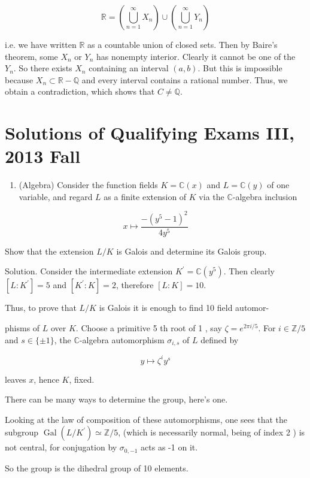\documentclass[10pt]{article}
\begin{document}
$$
\mathbb{R}=\left(\bigcup_{n=1}^{\infty} X_{n}\right) \cup\left(\bigcup_{n=1}^{\infty} Y_{n}\right)
$$

i.e. we have written $\mathbb{R}$ as a countable union of closed sets. Then by Baire's theorem, some $X_{n}$ or $Y_{n}$ has nonempty interior. Clearly it cannot be one of the $Y_{n}$. So there exists $X_{n}$ containing an interval $(a, b)$. But this is impossible because $X_{n} \subset \mathbb{R}-\mathbb{Q}$ and every interval contains a rational number. Thus, we obtain a contradiction, which shows that $C \neq \mathbb{Q}$.

\section{Solutions of Qualifying Exams III, 2013 Fall}
\begin{enumerate}
  \item (Algebra) Consider the function fields $K=\mathbb{C}(x)$ and $L=\mathbb{C}(y)$ of one variable, and regard $L$ as a finite extension of $K$ via the $\mathbb{C}$-algebra inclusion
\end{enumerate}

$$
x \mapsto \frac{-\left(y^{5}-1\right)^{2}}{4 y^{5}}
$$

Show that the extension $L / K$ is Galois and determine its Galois group.

Solution. Consider the intermediate extension $K^{\prime}=\mathbb{C}\left(y^{5}\right)$. Then clearly $\left[L: K^{\prime}\right]=5$ and $\left[K^{\prime}: K\right]=2$, therefore $[L: K]=10$.

Thus, to prove that $L / K$ is Galois it is enough to find 10 field automor-

phisms of $L$ over $K$. Choose a primitive 5 th root of 1 , say $\zeta=e^{2 \pi i / 5}$. For $i \in \mathbb{Z} / 5$ and $s \in\{ \pm 1\}$, the $\mathbb{C}$-algebra automorphism $\sigma_{i, s}$ of $L$ defined by

$$
y \mapsto \zeta^{i} y^{s}
$$

leaves $x$, hence $K$, fixed.

There can be many ways to determine the group, here's one.

Looking at the law of composition of these automorphisms, one sees that the subgroup $\operatorname{Gal}\left(L / K^{\prime}\right) \simeq \mathbb{Z} / 5$, (which is necessarily normal, being of index 2 ) is not central, for conjugation by $\sigma_{0,-1}$ acts as -1 on it.

So the group is the dihedral group of 10 elements.
\end{document}
